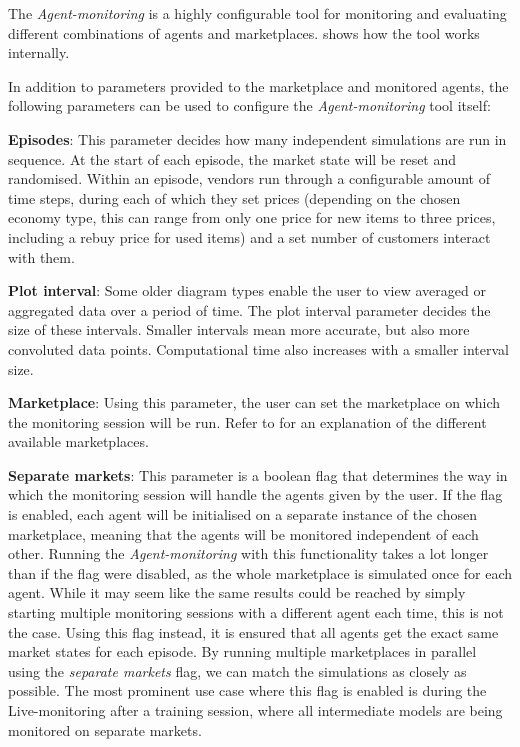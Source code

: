 The \emph{Agent-monitoring} is a highly configurable tool for monitoring and evaluating different combinations of agents and marketplaces.  shows how the tool works internally.

In addition to parameters provided to the marketplace and monitored agents, the following parameters can be used to configure the \emph{Agent-monitoring} tool itself:

\medskip
\noindent\textbf{Episodes}: This parameter decides how many independent simulations are run in sequence. At the start of each episode, the market state will be reset and randomised. Within an episode, vendors run through a configurable amount of time steps, during each of which they set prices (depending on the chosen economy type, this can range from only one price for new items to three prices, including a rebuy price for used items) and a set number of customers interact with them.

\medskip
\noindent\textbf{Plot interval}: Some older diagram types enable the user to view averaged or aggregated data over a period of time. The plot interval parameter decides the size of these intervals. Smaller intervals mean more accurate, but also more convoluted data points. Computational time also increases with a smaller interval size.

\medskip
\noindent\textbf{Marketplace}: Using this parameter, the user can set the marketplace on which the monitoring session will be run. Refer to  for an explanation of the different available marketplaces.

\medskip
\noindent\textbf{Separate markets}: This parameter is a boolean flag that determines the way in which the monitoring session will handle the agents given by the user. If the flag is enabled, each agent will be initialised on a separate instance of the chosen marketplace, meaning that the agents will be monitored independent of each other. Running the \emph{Agent-monitoring} with this functionality takes a lot longer than if the flag were disabled, as the whole marketplace is simulated once for each agent. While it may seem like the same results could be reached by simply starting multiple monitoring sessions with a different agent each time, this is not the case. Using this flag instead, it is ensured that all agents get the exact same market states for each episode. By running multiple marketplaces in parallel using the \emph{separate markets} flag, we can match the simulations as closely as possible. The most prominent use case where this flag is enabled is during the Live-monitoring after a training session, where all intermediate models are being monitored on separate markets.

